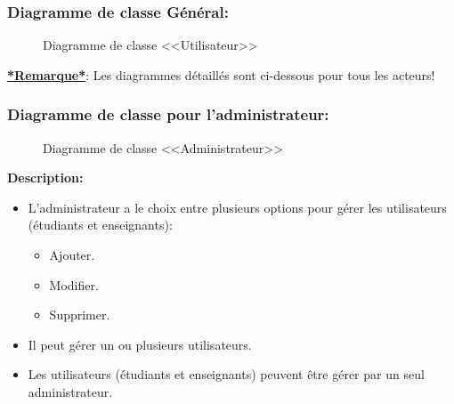 \documentclass[12pt]{report}
\begin{document}
\vspace{0.1in}

\subsubsection{Diagramme de classe Général:}

\vspace{0.1in}

\begin{figure}[h]
\centering
    \caption{Diagramme de classe <<Utilisateur>>}
\end{figure}

\textbf{\underline{*Remarque*}}: Les diagrammes détaillés sont ci-dessous pour tous les acteurs!

\newpage

\subsubsection{Diagramme de classe pour l'administrateur:}

\begin{figure}[h]
\centering
    \caption{Diagramme de classe <<Administrateur>>}
\end{figure}

\vspace{0.3in}

\textbf{Description:}

\begin{itemize}
    \item L'administrateur a le choix entre plusieurs options pour gérer les utilisateurs (étudiants et enseignants):
    \begin{itemize}
        \item Ajouter.
        \item Modifier.
        \item Supprimer.
    \end{itemize}
    \item Il peut gérer un ou plusieurs utilisateurs.
    \item Les utilisateurs (étudiants et enseignants) peuvent être gérer par un seul administrateur.
\end{itemize}
\end{document}
